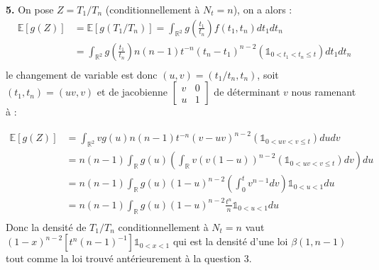 \documentclass[a4paper,10pt]{report}
\newcommand{\esp}[1]{\mathbb{E}\left[#1\right]} %
\begin{document}

\textbf{5.} On pose $Z = T_1/T_n$ (conditionnellement à $N_t = n$), on a alors :
$$
\begin{aligned}
\esp{g(Z)} & = \esp{g(T_1/T_n)} = \int_{\mathbb{R}^2} g\left(\frac{t_1}{t_n}\right) f(t_1,t_n) dt_1 dt_n\\
& = \int_{\mathbb{R}^2} g\left(\frac{t_1}{t_n}\right) n(n-1) t^{-n} (t_n - t_1)^{n-2} (\mathds{1}_{0 < t_1 < t_n \leq t}) dt_1 dt_n\\
\end{aligned}
$$
le changement de variable est donc $(u,v) = (t_1/t_n, t_n)$, soit $(t_1,t_n) = (uv, v)$ et de jacobienne 
$
\begin{bmatrix}
v & 0 \\
u & 1 
\end{bmatrix}	
$
de déterminant $v$ nous ramenant à :

$$
\begin{aligned}
\esp{g(Z)} & = \int_{\mathbb{R}^2} v g(u) n(n-1) t^{-n} (v - uv)^{n-2} (\mathds{1}_{0 < uv < v \leq t} ) du dv \\
& = n(n-1) \int_{\mathbb{R}} g(u) \left(\int_{\mathbb{R}} v(v(1-u))^{n-2} (\mathds{1}_{0 < uv < v \leq t} ) dv \right) du \\
& = n(n-1) \int_{\mathbb{R}} g(u) (1-u)^{n-2} \left(\int_{0}^{t} v^{n-1} dv \right) \mathds{1}_{0 < u < 1} du \\
& = n(n-1) \int_{\mathbb{R}} g(u) (1-u)^{n-2} \frac{t^n}{n} \mathds{1}_{0 < u < 1} du \\
\end{aligned}
$$
Donc la densité de $T_1/T_n$ conditionnellement à $N_t = n$ vaut $(1-x)^{n-2}\left[t^n(n-1)^{-1} \right] \mathds{1}_{0 < x < 1}$ qui est la densité d'une loi $\beta(1,n-1)$ tout comme la loi trouvé antérieurement à la question 3.
\end{document}
